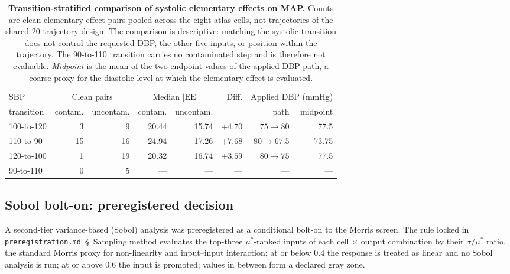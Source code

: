 \documentclass[pdflatex,sn-nature]{sn-jnl}%
\begin{document}
\begin{table}[htbp]
\centering
\caption{\textbf{Transition-stratified comparison of systolic elementary effects on MAP.} Counts are clean elementary-effect pairs pooled across the eight atlas cells, not trajectories of the shared 20-trajectory design. The comparison is descriptive: matching the systolic transition does not control the requested DBP, the other five inputs, or position within the trajectory. The 90-to-110 transition carries no contaminated step and is therefore not evaluable. \emph{Midpoint} is the mean of the two endpoint values of the applied-DBP path, a coarse proxy for the diastolic level at which the elementary effect is evaluated.}
\label{tab:transition-stratified}
\footnotesize
\begin{tabular}{lrrrrrrr}
\toprule
SBP & \multicolumn{2}{c}{Clean pairs} & \multicolumn{2}{c}{Median $|\mathrm{EE}|$} & Diff. & \multicolumn{2}{c}{Applied DBP (mmHg)} \\
\cmidrule(lr){2-3}\cmidrule(lr){4-5}\cmidrule(lr){7-8}
transition & contam. & uncontam. & contam. & uncontam. & & path & midpoint \\
\midrule
100-to-120 & 3 & 9 & 20.44 & 15.74 & $+4.70$ & $75 \to 80$ & 77.5 \\
110-to-90 & 15 & 16 & 24.94 & 17.26 & $+7.68$ & $80 \to 67.5$ & 73.75 \\
120-to-100 & 1 & 19 & 20.32 & 16.74 & $+3.59$ & $80 \to 75$ & 77.5 \\
90-to-110 & 0 & 5 & --- & --- & --- & --- & --- \\
\bottomrule
\end{tabular}
\end{table}

\subsection{Sobol bolt-on: preregistered decision}\label{sec:s3-sobol}

A second-tier variance-based (Sobol) analysis was preregistered as a conditional bolt-on to the Morris screen. The rule locked in \texttt{preregistration.md}~\S~Sampling method evaluates the top-three $\mu^{*}$-ranked inputs of each cell $\times$ output combination by their $\sigma / \mu^{*}$ ratio, the standard Morris proxy for non-linearity and input--input interaction: at or below 0.4 the response is treated as linear and no Sobol analysis is run; at or above 0.6 the input is promoted; values in between form a declared gray zone.
\end{document}
